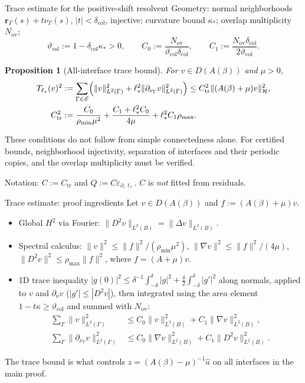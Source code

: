 \documentclass[aspectratio=169]{beamer}
\newcommand{\rin}{\rho_{\min}}
\newcommand{\rax}{\rho_{\max}}
\newcommand{\eps}{\varepsilon_{\partial,\ell_*}}
\newtheorem{proposition}[theorem]{Proposition}
\begin{document}
\begin{frame}{Trace estimate for the positive-shift resolvent}
  \footnotesize
  Geometry: normal neighborhoods $\boldsymbol r_\Gamma(s)+t\nu_\Gamma(s)$, $|t|<\delta_{\mathrm{col}}$,
  injective; curvature bound $\kappa_*$; overlap multiplicity $N_{\mathrm{ov}}$;
  \[
    \vartheta_{\mathrm{col}}:=1-\delta_{\mathrm{col}}\kappa_*>0,\qquad
    C_0:=\frac{N_{\mathrm{ov}}}{\vartheta_{\mathrm{col}}\delta_{\mathrm{col}}},\qquad
    C_1:=\frac{N_{\mathrm{ov}}\delta_{\mathrm{col}}}{2\vartheta_{\mathrm{col}}}.
  \]
  \begin{proposition}[All-interface trace bound]
    For $v\in D(A(\beta))$ and $\mu>0$,
    \begin{align*}
      T_{\ell_*}(v)^2&:=\sum_{\Gamma\in\mathscr E}\Bigl(\lVert v\rVert_{L^2(\Gamma)}^2
        +\ell_*^2\lVert\partial_{\nu_\Gamma}v\rVert_{L^2(\Gamma)}^2\Bigr)
      \le C_{\mathrm{tr}}^2\lVert(A(\beta)+\mu)v\rVert_{\mathcal H}^2,\\
      C_{\mathrm{tr}}^2&:=\frac{C_0}{\rin\mu^2}+\frac{C_1+\ell_*^2C_0}{4\mu}+\ell_*^2C_1\rax.
    \end{align*}
  \end{proposition}
  These conditions do not follow from simple connectedness alone. For certified
  bounds, neighborhood injectivity, separation of interfaces and their periodic
  copies, and the overlap multiplicity must be verified.

  \medskip
  Notation: $C:=C_{\mathrm{tr}}$ and $Q:=C\eps$. $C$ is \emph{not} fitted from residuals.
\end{frame}

\begin{frame}{Trace estimate: proof ingredients}
  \small
  Let $v\in D(A(\beta))$ and $f:=(A(\beta)+\mu)v$.
  \begin{itemize}
    \item Global $H^2$ via Fourier: $\lVert D^2v\rVert_{L^2(B)}=\lVert\Delta v\rVert_{L^2(B)}$.
    \item Spectral calculus: $\lVert v\rVert^2\le\lVert f\rVert^2/(\rin\mu^2)$,
      $\lVert\nabla v\rVert^2\le\lVert f\rVert^2/(4\mu)$,
      $\lVert D^2v\rVert^2\le\rax\lVert f\rVert^2$, where $f=(A+\mu)v$.
    \item 1D trace inequality
      $|g(0)|^2\le\delta^{-1}\!\int_{-\delta}^{\delta}|g|^2+\frac\delta2\int_{-\delta}^{\delta}|g'|^2$
      along normals, applied to $v$ and $\partial_\nu v$ ($|g'|\le|D^2v|$), then
      integrated using the area element $1-t\kappa\ge\vartheta_{\mathrm{col}}$ and summed
      with $N_{\mathrm{ov}}$:
      \begin{align*}
        \textstyle\sum_\Gamma\lVert v\rVert_{L^2(\Gamma)}^2
        &\le C_0\lVert v\rVert_{L^2(B)}^2+C_1\lVert\nabla v\rVert_{L^2(B)}^2,\\
        \textstyle\sum_\Gamma\lVert\partial_{\nu_\Gamma}v\rVert_{L^2(\Gamma)}^2
        &\le C_0\lVert\nabla v\rVert_{L^2(B)}^2+C_1\lVert D^2v\rVert_{L^2(B)}^2.
      \end{align*}
  \end{itemize}
  The trace bound is what controls $z=(A(\beta)-\mu)^{-1}\widehat u$ on all interfaces
  in the main proof.
\end{frame}
\end{document}
